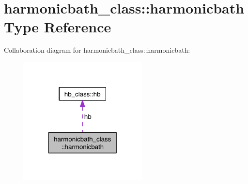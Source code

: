 \hypertarget{structharmonicbath__class_1_1harmonicbath}{}\section{harmonicbath\+\_\+class\+:\+:harmonicbath Type Reference}
\label{structharmonicbath__class_1_1harmonicbath}


Collaboration diagram for harmonicbath\+\_\+class\+:\+:harmonicbath\+:\nopagebreak
\begin{figure}[H]
\begin{center}
\leavevmode
\includegraphics[width=184pt]{structharmonicbath__class_1_1harmonicbath__coll__graph}
\end{center}
\end{figure}
